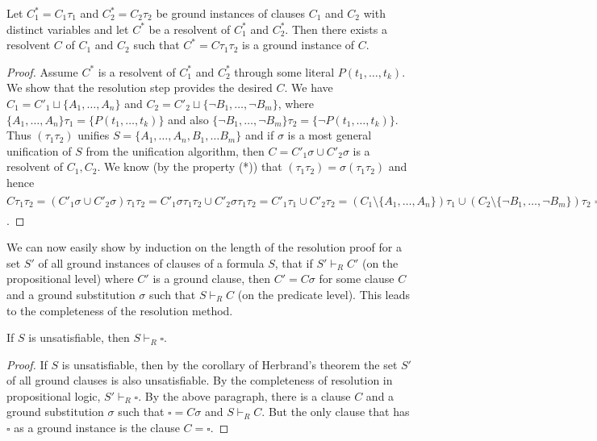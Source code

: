 \begin{lemma}[lifting]
Let $C^*_1 = C_1 \tau_1$ and $C^*_2 = C_2 \tau_2$ be ground instances of clauses $C_1$ and $C_2$ with distinct variables and let $C^*$ be a resolvent of $C^*_1$ and $C^*_2$. Then there exists a resolvent $C$ of $C_1$ and $C_2$ such that $C^* = C \tau_1 \tau_2$ is a ground instance of $C$.
\end{lemma}
\begin{proof}
Assume $C^*$ is a resolvent of $C^*_1$ and $C^*_2$ through some literal $P(t_1, \dots, t_k)$. We show that the resolution step provides the desired $C$. We have $C_1 = C'_1 \sqcup \{A_1, \dots, A_n\}$ and $C_2 = C'_2 \sqcup \{\neg B_1, \dots, \neg B_m\}$, where $\{A_1, \dots, A_n\}\tau_1 = \{P(t_1, \dots, t_k)\}$ and also $\{\neg B_1, \dots, \neg B_m\}\tau_2 = \{\neg P(t_1, \dots, t_k)\}$. Thus $(\tau_1 \tau_2)$ unifies $S = \{A_1, \dots, A_n, B_1, \dots B_m\}$ and if $\sigma$ is a most general unification of $S$ from the unification algorithm, then $C = C'_1 \sigma \cup C'_2 \sigma$ is a resolvent of $C_1, C_2$. We know (by the property (*)) that $(\tau_1 \tau_2) = \sigma(\tau_1 \tau_2)$ and hence $C \tau_1 \tau_2 = (C'_1 \sigma \cup C'_2 \sigma)\tau_1 \tau_2 = C'_1 \sigma \tau_1 \tau_2 \cup C'_2 \sigma \tau_1 \tau_2 = C'_1 \tau_1 \cup C'_2 \tau_2 = (C_1 \setminus \{A_1, \dots, A_n\})\tau_1 \cup (C_2 \setminus \{\neg B_1, \dots, \neg B_m\})\tau_2 = (C^*_1 \setminus \{P(t_1, \dots, t_k\}) \cup (C^*_2 \setminus \{\neg P(t_1, \dots, t_k)\}) = C^*$. 
\end{proof}

We can now easily show by induction on the length of the resolution proof for a set $S'$ of all ground instances of clauses of a formula $S$, that if $S' \vdash_R C'$ (on the propositional level) where $C'$ is a ground clause, then $C' = C \sigma$ for some clause $C$ and a ground substitution $\sigma$ such that $S \vdash_R C$ (on the predicate level). This leads to the completeness of the resolution method.

\begin{theorem}
If $S$ is unsatisfiable, then $S \vdash_R \square$.
\end{theorem}
\begin{proof}
If $S$ is unsatisfiable, then by the corollary of Herbrand's theorem the set $S'$ of all ground clauses is also unsatisfiable. By the completeness of resolution in propositional logic, $S' \vdash_R \square$. By the above paragraph, there is a clause $C$ and a ground substitution $\sigma$ such that $\square = C \sigma$ and $S \vdash_R C$. But the only clause that has $\square$ as a ground instance is the clause $C = \square$.
\end{proof}

